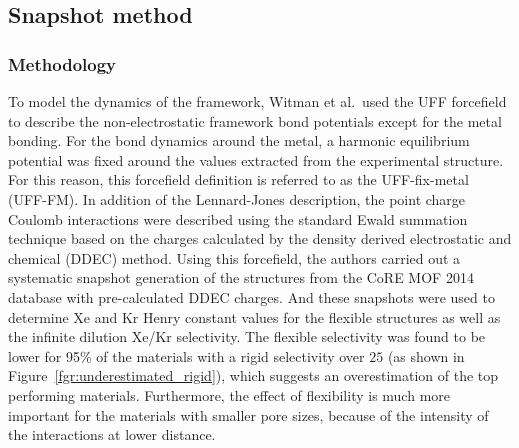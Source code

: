 \documentclass[main]{subfiles}
\begin{document}
\subsection{Snapshot method}

\subsubsection{Methodology}

To model the dynamics of the framework, Witman et al.\ used the UFF forcefield to describe the non-electrostatic framework bond potentials except for the metal bonding. For the bond dynamics around the metal, a harmonic equilibrium potential was fixed around the values extracted from the experimental structure. For this reason, this forcefield definition is referred to as the UFF-fix-metal (UFF-FM). In addition of the Lennard-Jones description, the point charge Coulomb interactions were described using the standard Ewald summation technique based on the charges calculated by the density derived electrostatic and chemical (DDEC) method.\autocite{manz2010chemically} Using this forcefield, the authors carried out a systematic snapshot generation of the structures from the CoRE MOF 2014 database with pre-calculated DDEC charges. And these snapshots were used to determine Xe and Kr Henry constant values for the flexible structures as well as the infinite dilution Xe/Kr selectivity. The flexible selectivity was found to be lower for {95\%} of the materials with a rigid selectivity over $25$ (as shown in Figure~\ref{fgr:underestimated_rigid}), which suggests an overestimation of the top performing materials. Furthermore, the effect of flexibility is much more important for the materials with smaller pore sizes, because of the intensity of the interactions at lower distance. 
\end{document}
